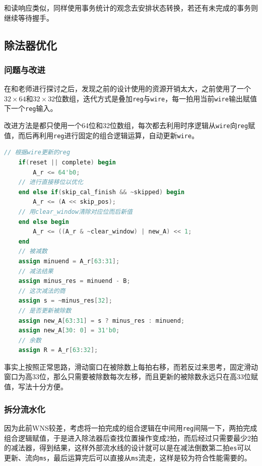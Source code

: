 \documentclass[UTF-8,twoside,c5size]{ctexart}
\begin{document}
	和读响应类似，同样使用事务统计的观念去安排状态转换，若还有未完成的事务则继续等待握手。

	\subsection{除法器优化}
	
	\subsubsection{问题与改进}
	
	在和老师进行探讨之后，发现之前的设计使用的资源开销太大，之前使用了一个$32\times 64$和$32\times 32$位数组，迭代方式是叠加\texttt{reg}与\texttt{wire}，每一拍用当前\texttt{wire}输出赋值下一个\texttt{reg}输入。
	
	改进方法是都只使用一个64位和32位数组，每次都去利用时序逻辑从\texttt{wire}向\texttt{reg}赋值，而后再利用\texttt{reg}进行固定的组合逻辑运算，自动更新\texttt{wire}。
	
	\begin{lstlisting}[language=verilog]
	// 根据wire更新的reg
    if(reset || complete) begin
        A_r <= 64'b0;
    // 进行直接移位以优化
    end else if(skip_cal_finish && ~skipped) begin
        A_r <= (A << skip_pos);
    // 用clear_window清除对应位而后新值
    end else begin
        A_r <= ((A_r & ~clear_window) | new_A) << 1;
    end
    // 被减数
    assign minuend = A_r[63:31];
    // 减法结果
    assign minus_res = minuend - B;
    // 这次减法的商
    assign s = ~minus_res[32];
    // 是否更新被除数
    assign new_A[63:31] = s ? minus_res : minuend;
    assign new_A[30: 0] = 31'b0;
    // 余数
    assign R = A_r[63:32];
	\end{lstlisting}
	
	事实上按照正常思路，滑动窗口在被除数上每拍右移，而若反过来思考，固定滑动窗口为高33位，那么只需要被除数每次左移，而且更新的被除数永远只在高33位赋值，写法十分方便。
	
	\subsubsection{拆分流水化}
	
	因为此前WNS较差，考虑将一拍完成的组合逻辑在中间用\texttt{reg}间隔一下，两拍完成组合逻辑赋值，于是进入除法器后查找位置操作变成2拍，而后经过只需要最少2拍的减法器，得到结果，这样外部流水线的设计就可以是在减法倒数第二拍\texttt{es}可以更新、流向\texttt{ms}，最后运算完后可以直接从\texttt{ms}流走，这样是较为符合性能需要的。
	
\end{document}
